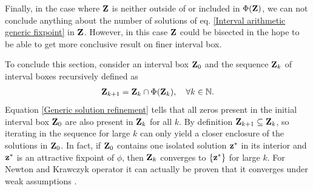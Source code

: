 \documentclass[
11pt, %
american, %
singlespacing, %
final, %
nolistspacing, %
liststotoc, %
headsepline, %
]{MastersDoctoralThesis} %
\begin{document}
Finally, in the case where $\boldsymbol{\mathrm{Z}}$ is neither outside of or included in $\Phi(\boldsymbol{\mathrm{Z}})$, we can not conclude anything about the number of solutions of eq. \eqref{Interval arithmetic generic fixpoint} in $\boldsymbol{\mathrm{Z}}$. However, in this case $\boldsymbol{\mathrm{Z}}$ could be bisected in the hope to be able to get more conclusive result on finer interval box.

To conclude this section, consider an interval box $\boldsymbol{\mathrm{Z}}_0$ and the sequence $\boldsymbol{\mathrm{Z}}_k$ of interval boxes recursively defined as
\begin{align}
	\boldsymbol{\mathrm{Z}}_{k+1} = \boldsymbol{\mathrm{Z}}_k \cap \Phi(\boldsymbol{\mathrm{Z}}_k), \quad \forall k \in \mathbb{N}. \label{Generic refinement iteration}
\end{align}
Equation \eqref{Generic solution refinement} tells that all zeros present in the initial interval box $\boldsymbol{\mathrm{Z}}_0$ are also present in $\boldsymbol{\mathrm{Z}}_k$ for all $k$. By definition $\boldsymbol{\mathrm{Z}}_{k+1} \subseteq \boldsymbol{\mathrm{Z}}_k$, so iterating in the sequence for large $k$ can only yield a closer enclosure of the solutions in $\boldsymbol{\mathrm{Z}}_0$. In fact, if $\boldsymbol{\mathrm{Z}}_0$ contains one isolated solution $\boldsymbol{\mathrm{z}}^*$ in its interior and $\boldsymbol{\mathrm{z}}^*$ is an attractive fixpoint of $\phi$, then $\boldsymbol{\mathrm{Z}}_k$ converges to $\{\boldsymbol{\mathrm{z}}^*\}$ for large $k$. For Newton and Krawczyk operator it can actually be proven that it converges under weak assumptions \cite{moore2009introduction, tucker2011validated}.
\end{document}
